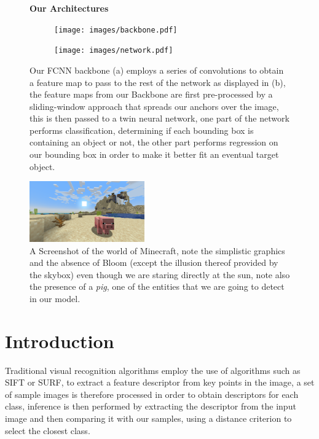 \documentclass[10pt,journal,cspaper,compsoc]{IEEEtran}
\newcommand*{\figuretitle}[1]{%
    {\centering%
    \textbf{#1}%
    \par\medskip}%
}
\begin{document}
\begin{figure}[tb]
    \centering
    \figuretitle{Our Architectures}
    \begin{subfigure}[t]{0.49\linewidth}
        \centering
        \texttt{[image: images/backbone.pdf]}
    \end{subfigure}
    \hfill
    \begin{subfigure}[t]{0.49\linewidth}
        \centering
        \texttt{[image: images/network.pdf]}
    \end{subfigure}
    \caption{Our FCNN backbone (a) employs a series of convolutions to obtain a feature map to pass to 
    the rest of the network as displayed in (b), the feature maps from our Backbone are first pre-processed
    by a sliding-window approach that spreads our anchors over the image, this is then passed to a twin neural
    network, one part of the network performs classification, determining if each bounding box is containing an
    object or not, the other part performs regression on our bounding box in order to make it better fit an eventual
    target object.}
    \label{fig:network}
\end{figure}


\begin{figure}[tb]
    \centering
    \includegraphics[width=0.44\textwidth]{images/pig.png}
    \caption{A Screenshot of the world of Minecraft, note the simplistic graphics and the absence of Bloom (except the illusion thereof provided by the 
    skybox) even though we are staring directly at the sun, note also the presence of a \emph{pig}, one of the entities that we are going to detect 
    in our model.}
    \label{fig:piggy}
\end{figure}

    \section{Introduction}
    Traditional visual recognition algorithms employ the use of algorithms such as SIFT 
    or SURF\cite{Lowe:SIFT,Bay:SURF}, to extract a feature descriptor from key points 
    in the image, a set of sample images is therefore processed in order to obtain descriptors 
    for each class, inference is then performed by extracting the descriptor from the input image 
    and then comparing it with our samples, using a distance criterion to select the closest class.
\end{document}
